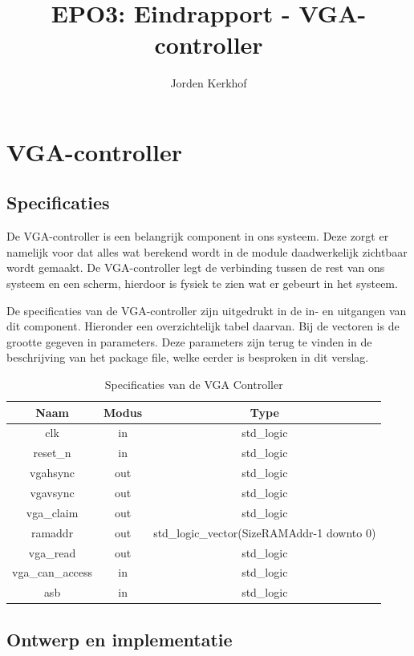 \documentclass{scrartcl}  %
\author{ Jorden {Kerkhof}  }
\title{EPO3: Eindrapport - VGA-controller}
\begin{document}
\section{VGA-controller}
\label{sec:vga-controller}





\subsection{Specificaties}

De VGA-controller is een belangrijk component in ons systeem. Deze zorgt er namelijk voor dat alles wat berekend wordt in de module daadwerkelijk zichtbaar wordt gemaakt. De VGA-controller legt de verbinding tussen de rest van ons systeem en een scherm, hierdoor is fysiek te zien wat er gebeurt in het systeem. 

De specificaties van de VGA-controller zijn uitgedrukt in de in- en uitgangen van dit component. Hieronder een overzichtelijk tabel daarvan. Bij de vectoren is de grootte gegeven in parameters. Deze parameters zijn terug te vinden in de beschrijving van het package file, welke eerder is besproken in dit verslag.

\begin{table}[H]
\centering
\caption{Specificaties van de VGA Controller }
\label{tab:spec-vgacontroller}
\begin{tabular}{c c c}
	\hline\hline
 	Naam & Modus & Type\\
 	\hline	
	clk & in & std\_logic \\ 
	reset\_n & in & std\_logic \\ 
	vgahsync & out & std\_logic \\ 
	vgavsync & out & std\_logic \\ 
	vga\_claim & out & std\_logic \\ 
	ramaddr & out & std\_logic\_vector(SizeRAMAddr-1 downto 0) \\
	vga\_read & out & std\_logic \\
	vga\_can\_access & in & std\_logic \\
	asb & in & std\_logic \\
  	\hline\hline
\end{tabular}
\end{table}


\subsection{Ontwerp en implementatie}
\end{document}
